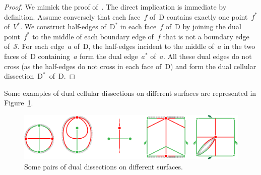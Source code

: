 \documentclass{amsart}
\theoremstyle{definition}
\newtheorem{remark}[theorem]{Remark}
\newcommand{\fref}[1]{Figure~\ref{#1}} %
\newcommand{\surface}{\mathcal{S}} %
\newcommand{\dual}{^*} %
\newcommand{\dissection}{\mathrm{D}} %
\begin{document}
\begin{proof}
We mimick the proof of~\cite[Prop.~1.12]{OpperPlamondonSchroll}.
The direct implication is immediate by definition.
Assume conversely that each face~$f$ of~$\dissection$ contains exactly one point~$f\dual$ of~$V\dual$.
We construct half-edges of~$\dissection\dual$ in each face~$f$ of~$\dissection$ by joining the dual point~$f\dual$ to the middle of each boundary edge of~$f$ that is not a boundary edge of~$\surface$.
For each edge~$a$ of~$\dissection$, the half-edges incident to the middle of~$a$ in the two faces of~$\dissection$ containing~$a$ form the dual edge~$a\dual$ of~$a$.
All these dual edges do not cross (as the half-edges do not cross in each face of~$\dissection$) and form the dual cellular dissection~$\dissection\dual$~of~$\dissection$.
\end{proof}


Some examples of dual cellular dissections on different surfaces are represented in \fref{fig:dissections}.

\begin{figure}[t]
	\capstart
	\centerline{\includegraphics[scale=.7]{dissections}}
	\caption{Some pairs of dual dissections on different surfaces.}
	\label{fig:dissections}
\end{figure}
\end{document}
